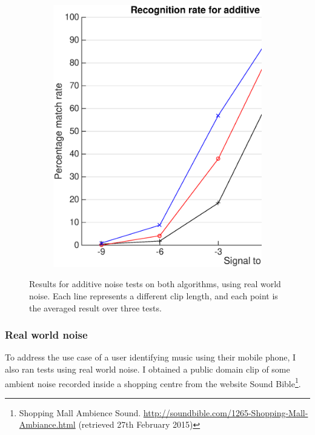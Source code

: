 \documentclass[12pt,a4paper,twoside,openright]{report}
\begin{document}
\begin{figure}[p]
    \begin{subfigure}{\textwidth}
      \includegraphics[width=\textwidth]{./figs/natural_shazam_results.eps} 
    \end{subfigure}

    \vspace{15mm}

    \caption{Results for additive noise tests on both algorithms, using real world noise. Each line represents a different clip length, and each point is the averaged result over three tests.}
    \label{fig:natural_results}
\end{figure}

\subsubsection{Real world noise}

To address the use case of a user identifying music using their mobile phone, I also ran tests using real world noise. I obtained a public domain clip of some ambient noise recorded inside a shopping centre from the website Sound Bible\footnote{Shopping Mall Ambience Sound. \url{http://soundbible.com/1265-Shopping-Mall-Ambiance.html} (retrieved 27th February 2015)}.
\end{document}

